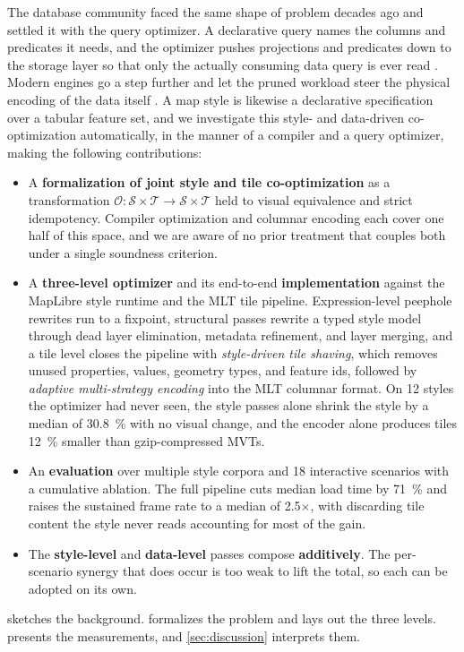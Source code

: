 The database community faced the same shape of problem decades ago and settled it with the query optimizer.
A declarative query names the columns and predicates it needs, and the optimizer pushes projections and predicates down to the storage layer so that only the actually consuming data query is ever read \citep{selingerAccessPathSelection1979,piraheshExtensibleRuleBased1992,graefeQueryEvaluationTechniques1993}.
Modern engines go a step further and let the pruned workload steer the physical encoding of the data itself \citep{armbrustSparkSQLRelational2015,dingSageDBInstanceOptimizedData2022}.
A map style is likewise a declarative specification over a tabular feature set, and we investigate this style- and data-driven co-optimization automatically, in the manner of a compiler and a query optimizer, making the following contributions:

\begin{itemize}
    \item A \textbf{formalization of joint style and tile co-optimization} as a transformation $\mathcal{O}: \mathcal{S} \times \mathcal{T} \to \mathcal{S} \times \mathcal{T}$ held to visual equivalence and strict idempotency.
    Compiler optimization and columnar encoding each cover one half of this space, and we are aware of no prior treatment that couples both under a single soundness criterion.
    \item A \textbf{three-level optimizer} and its end-to-end \textbf{implementation} against the MapLibre style runtime and the \ac{MLT} tile pipeline.
    Expression-level peephole rewrites run to a fixpoint, structural passes rewrite a typed style model through dead layer elimination, metadata refinement, and layer merging, and a tile level closes the pipeline with \emph{style-driven tile shaving}, which removes unused properties, values, geometry types, and feature ids, followed by \emph{adaptive multi-strategy encoding} into the \ac{MLT} columnar format.
    On \num{12} styles the optimizer had never seen, the style passes alone shrink the style by a median of \qty{30.8}{\percent} with no visual change, and the encoder alone produces tiles \qty{12}{\percent} smaller than gzip-compressed \acp{MVT}.
    \item An \textbf{evaluation} over multiple style corpora and 18 interactive scenarios with a cumulative ablation.
    The full pipeline cuts median load time by \qty{71}{\percent} and raises the sustained frame rate to a median of \num{2.5}$\times$, with discarding tile content the style never reads accounting for most of the gain.
    \item The \textbf{style-level} and \textbf{data-level} passes compose \textbf{additively}. The per-scenario synergy that does occur is too weak to lift the total, so each can be adopted on its own.
\end{itemize}

 sketches the background.
 formalizes the problem and lays out the three levels.
 presents the measurements, and \cref{sec:discussion} interprets them.
